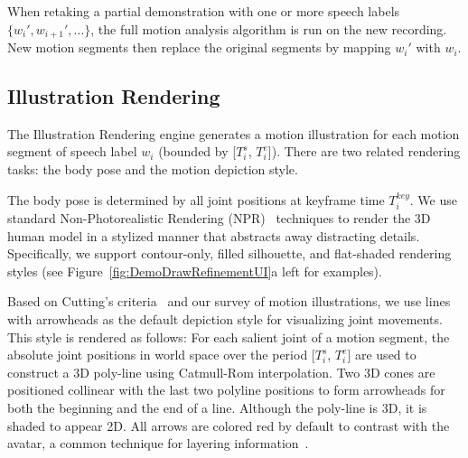 When retaking a partial demonstration with one or more speech labels $\{w_i', w_{i+1}', ...\}$, the full motion analysis algorithm is run on the new recording. New motion segments then replace the original segments by mapping $w_i'$ with $w_i$.


\subsection{Illustration Rendering}

The Illustration Rendering engine generates a motion illustration for each motion segment of speech label $w_i$ (bounded by [$T_i^s$, $T_i^e$]). There are two related rendering tasks: the body pose and the motion depiction style.

The body pose is determined by all joint positions at keyframe time $T_i^{key}$.
We use standard Non-Photorealistic Rendering (NPR)~\cite{gooch1998non} techniques to render the 3D human model in a stylized manner that abstracts away distracting details. Specifically, we support contour-only, filled silhouette, and flat-shaded rendering styles
(see Figure~\ref{fig:DemoDrawRefinementUI}a left for examples).

Based on Cutting's criteria~\cite{cutting_representing_2002} and our survey of motion illustrations, we use lines with arrowheads as the default depiction style for visualizing joint movements.
This style is rendered as follows:
%
For each salient joint of a motion segment, the absolute joint positions in world space over the period [$T_i^s$, $T_i^e$] are used to construct a 3D poly-line using Catmull-Rom interpolation.
Two 3D cones are positioned collinear with the last two polyline positions to form arrowheads for both the beginning and the end of a line.
%
Although the poly-line is 3D, it is shaded to appear 2D.
%
All arrows are colored red by default to contrast with the avatar, a common technique for layering information~\cite{tufte1990envisioning}.

